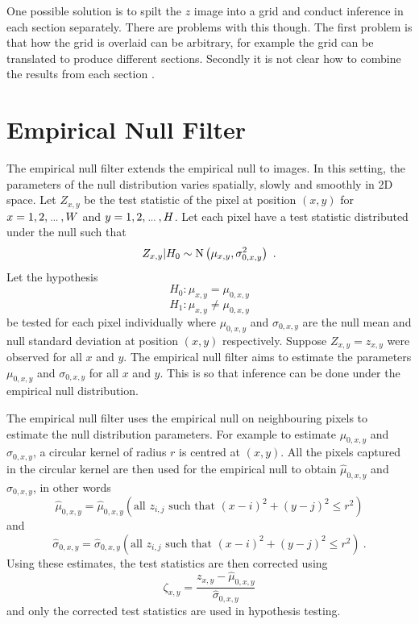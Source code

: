 One possible solution is to spilt the $z$ image into a grid and conduct inference in each section separately. There are problems with this though. The first problem is that how the grid is overlaid can be arbitrary, for example the grid can be translated to produce different sections. Secondly it is not clear how to combine the results from each section \citep{efron2008simultaneous}.

\section{Empirical Null Filter}

The empirical null filter extends the empirical null to images. In this setting, the parameters of the null distribution varies spatially, slowly and smoothly in 2D space. Let $Z_{x,y}$ be the test statistic of the pixel at position $(x,y)$ for $x=1,2,\dotdotdot,W$ and $y=1,2,\dotdotdot,H$. Let each pixel have a test statistic distributed under the null such that
\begin{equation}
	Z_{x,y}|H_0\sim\operatorname{N}\left(
		\mu_{x,y},\sigma_{0,x,y}^2
	\right)
	\ .
\end{equation}
Let the hypothesis
\begin{equation}
	H_0:\mu_{x,y}=\mu_{0,x,y}
\end{equation}
\begin{equation}
	H_1:\mu_{x,y}\neq\mu_{0,x,y}
\end{equation}
be tested for each pixel individually where $\mu_{0,x,y}$ and $\sigma_{0,x,y}$ are the null mean and null standard deviation at position $(x,y)$ respectively. Suppose $Z_{x,y}=z_{x,y}$ were observed for all $x$ and $y$. The empirical null filter aims to estimate the parameters $\mu_{0,x,y}$ and $\sigma_{0,x,y}$ for all $x$ and $y$. This is so that inference can be done under the empirical null distribution. 

The empirical null filter uses the empirical null on neighbouring pixels to estimate the null distribution parameters. For example to estimate $\mu_{0,x,y}$ and $\sigma_{0,x,y}$, a circular kernel of radius $r$ is centred at $(x,y)$. All the pixels captured in the circular kernel are then used for the empirical null to obtain $\widehat{\mu}_{0,x,y}$ and $\widehat{\sigma}_{0,x,y}$, in other words
\begin{equation}
	\widehat{\mu}_{0,x,y}
	=
	\widehat{\mu}_{0,x,y}
		\left(
			\text{all }z_{i,j}\text{ such that }(x-i)^2+(y-j)^2\leqslant r^2
		\right)
\end{equation}
and
\begin{equation}
	\widehat{\sigma}_{0,x,y}
	=
	\widehat{\sigma}_{0,x,y}
		\left(
			\text{all }z_{i,j}\text{ such that }(x-i)^2+(y-j)^2\leqslant r^2
		\right)
	\ .
\end{equation}
Using these estimates, the test statistics are then corrected using
\begin{equation}
	\zeta_{x,y} = 
	\dfrac{
		z_{x,y}-\widehat{\mu}_{0,x,y}
	}
	{
		\widehat{\sigma}_{0,x,y}
	}
\end{equation}
and only the corrected test statistics are used in hypothesis testing.

